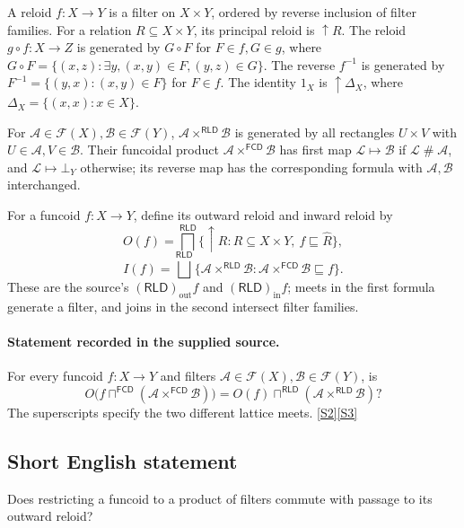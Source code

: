 \documentclass[11pt]{article}
\newcommand{\sref}[2]{\hyperlink{source:#1:#2}{[S#2]}}
\begin{document}
A reloid $f:X\to Y$ is a filter on $X\times Y$, ordered by reverse inclusion of filter families. For a relation $R\subseteq X\times Y$, its principal reloid is $\uparrow R$. The reloid $g\circ f:X\to Z$ is generated by $G\circ F$ for $F\in f,G\in g$, where $G\circ F=\{(x,z):\exists y,(x,y)\in F,(y,z)\in G\}$. The reverse $f^{-1}$ is generated by $F^{-1}=\{(y,x):(x,y)\in F\}$ for $F\in f$. The identity $1_X$ is $\uparrow\Delta_X$, where $\Delta_X=\{(x,x):x\in X\}$.

For $\mathcal A\in\mathcal F(X),\mathcal B\in\mathcal F(Y)$, $\mathcal A\times^{\mathsf{RLD}}\mathcal B$ is generated by all rectangles $U\times V$ with $U\in\mathcal A,V\in\mathcal B$. Their funcoidal product $\mathcal A\times^{\mathsf{FCD}}\mathcal B$ has first map $\mathcal L\mapsto\mathcal B$ if $\mathcal L\mathrel{\#}\mathcal A$, and $\mathcal L\mapsto\bot_Y$ otherwise; its reverse map has the corresponding formula with $\mathcal A,\mathcal B$ interchanged.

For a funcoid $f:X\to Y$, define its outward reloid and inward reloid by
\[
 O(f)=\bigsqcap^{\mathsf{RLD}}\{\uparrow R:R\subseteq X\times Y,\ f\sqsubseteq\widehat R\},
\]
\[
 I(f)=\bigsqcup^{\mathsf{RLD}}\{\mathcal A\times^{\mathsf{RLD}}\mathcal B:
       \mathcal A\times^{\mathsf{FCD}}\mathcal B\sqsubseteq f\}.
\]
These are the source's $(\mathsf{RLD})_{\mathrm{out}}f$ and $(\mathsf{RLD})_{\mathrm{in}}f$; meets in the first formula generate a filter, and joins in the second intersect filter families.
\paragraph{Statement recorded in the supplied source.}
For every funcoid $f:X\to Y$ and filters $\mathcal A\in\mathcal F(X),\mathcal B\in\mathcal F(Y)$, is
\[
 O\bigl(f\sqcap^{\mathsf{FCD}}(\mathcal A\times^{\mathsf{FCD}}\mathcal B)\bigr)
 =O(f)\sqcap^{\mathsf{RLD}}(\mathcal A\times^{\mathsf{RLD}}\mathcal B)?
\]
The superscripts specify the two different lattice meets. \sref{statement}{2}\sref{statement}{3}
\subsection{Short English statement}
Does restricting a funcoid to a product of filters commute with passage to its outward reloid?
\end{document}
